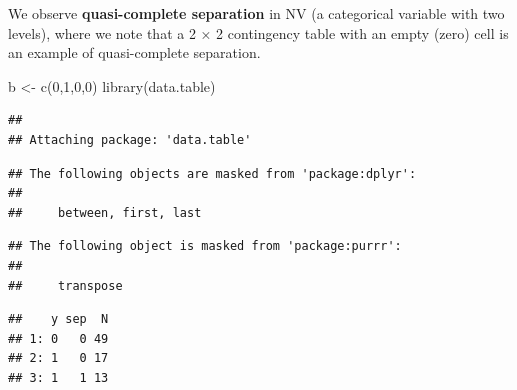 \documentclass[
  ignorenonframetext,
]{beamer}
\newenvironment{Shaded}{\begin{snugshade}}{\end{snugshade}}
\newcommand{\DecValTok}[1]{\textcolor[rgb]{0.00,0.00,0.81}{#1}}
\newcommand{\FunctionTok}[1]{\textcolor[rgb]{0.00,0.00,0.00}{#1}}
\newcommand{\NormalTok}[1]{#1}
\newcommand{\OtherTok}[1]{\textcolor[rgb]{0.56,0.35,0.01}{#1}}
\newcommand{\SpecialCharTok}[1]{\textcolor[rgb]{0.00,0.00,0.00}{#1}}
\newcommand{\StringTok}[1]{\textcolor[rgb]{0.31,0.60,0.02}{#1}}
\begin{document}
\begin{frame}[fragile]{}
\protect\hypertarget{section-17}{}
We observe \textbf{quasi-complete separation} in NV (a categorical
variable with two levels), where we note that a 2 × 2 contingency table
with an empty (zero) cell is an example of quasi-complete separation.

\vspace{12pt}
\tiny

\begin{Shaded}
\begin{Highlighting}[]
\NormalTok{b }\OtherTok{\textless{}{-}} \FunctionTok{c}\NormalTok{(}\DecValTok{0}\NormalTok{,}\DecValTok{1}\NormalTok{,}\DecValTok{0}\NormalTok{,}\DecValTok{0}\NormalTok{)}
\FunctionTok{library}\NormalTok{(data.table)}
\end{Highlighting}
\end{Shaded}

\begin{verbatim}
## 
## Attaching package: 'data.table'
\end{verbatim}

\begin{verbatim}
## The following objects are masked from 'package:dplyr':
## 
##     between, first, last
\end{verbatim}

\begin{verbatim}
## The following object is masked from 'package:purrr':
## 
##     transpose
\end{verbatim}

\begin{Shaded}
\end{Shaded}

\begin{verbatim}
##    y sep  N
## 1: 0   0 49
## 2: 1   0 17
## 3: 1   1 13
\end{verbatim}
\end{frame}
\end{document}
